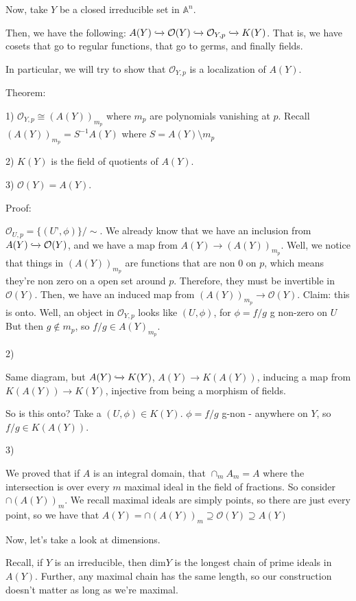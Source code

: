 \documentclass[10pt]{article}
\begin{document}
Now, take $Y$ be a closed irreducible set in $\mathbb{A}^n$.

Then, we have the following: $A(Y) \xhookrightarrow{} \mathcal{O}(Y) \xhookrightarrow{} \mathcal{O}_{Y, p} \xhookrightarrow{} K(Y)$. That is, we have cosets that go to regular functions, that go to germs, and finally fields.

In particular, we will try to show that $\mathcal{O}_{Y, p}$ is a localization of $A(Y)$. 

Theorem:

1) $\mathcal{O}_{Y,p} \cong (A(Y))_{m_p}$ where $m_p$ are polynomials vanishing at $p$. Recall $(A(Y))_{m_p} = S^{-1}A(Y)$ where $S = A(Y) \setminus m_p$

2) $K(Y)$ is the field of quotients of $A(Y)$.

3) $\mathcal{O}(Y) = A(Y)$.

Proof:

$\mathcal{O}_{U,p} = \{ (U’, \phi)  \} / \sim$. We already know that we have an inclusion from $A(Y) \xhookrightarrow{} \mathcal{O}(Y)$, and we have a map from $A(Y) \to (A(Y))_{m_p}$. Well, we notice that things in $(A(Y))_{m_p}$ are functions that are non 0 on $p$, which means they’re non zero on a open set around $p$. Therefore, they must be invertible in  $\mathcal{O}(Y)$. Then, we have an induced map from $(A(Y))_{m_p} \to  \mathcal{O}(Y)$. Claim: this is onto. Well, an object in $\mathcal{O}_{Y,p}$ looks like $(U, \phi)$, for $\phi = f/g$ g non-zero on $U$ But then $g \not \in m_p$, so $f/g \in A(Y)_{m_p}$.

2)

Same diagram, but $A(Y) \xhookrightarrow{} K(Y)$, $A(Y) \to K(A(Y))$, inducing a map from $K(A(Y)) \to K(Y)$, injective from being a morphism of fields. 

So is this onto? Take a $(U,\phi) \in K(Y)$. $\phi = f/g$ g-non - anywhere on $Y$, so $f/g \in K(A(Y))$.

3)

We proved that if $A$ is an integral domain, that $\cap_m A_m = A$ where the intersection is over every $m$ maximal ideal in the field of fractions. So consider $\cap (A(Y))_m$. We recall maximal ideals are simply points, so there are just every point, so we have that $A(Y) = \cap (A(Y))_m \supseteq \mathcal{O}(Y) \supseteq A(Y)$

Now, let’s take a look at dimensions. 

Recall, if $Y$ is an irreducible, then dim$Y$ is the longest chain of prime ideals in $A(Y)$. Further, any maximal chain has the same length, so our construction doesn’t matter as long as we’re maximal. 
\end{document}
